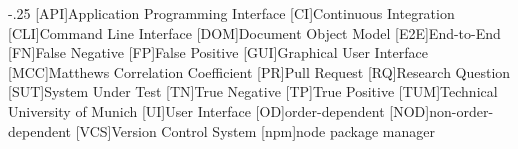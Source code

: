 
\begin{acronym}
    \itemsep-.25\baselineskip
    [API]{Application Programming Interface}
    [CI]{Continuous Integration}
    [CLI]{Command Line Interface}
    [DOM]{Document Object Model}
    [E2E]{End-to-End}
    [FN]{False Negative}
    [FP]{False Positive}
    [GUI]{Graphical User Interface}
    [MCC]{Matthews Correlation Coefficient}
    [PR]{Pull Request}
    [RQ]{Research Question}
    [SUT]{System Under Test}
    [TN]{True Negative}
    [TP]{True Positive}
    [TUM]{Technical University of Munich}
    [UI]{User Interface}
    [OD]{order-dependent}
    [NOD]{non-order-dependent}
    [VCS]{Version Control System}
    [npm]{node package manager}
\end{acronym}
